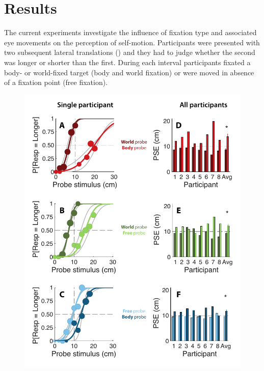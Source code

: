 \section{Results}

The current experiments investigate the influence of fixation type and associated eye movements on the perception of self-motion. Participants were presented with two subsequent lateral translations () and they had to judge whether the second was longer or shorter than the first. During each interval participants fixated a body- or world-fixed target (body and world fixation) or were moved in absence of a fixation point (free fixation).

\begin{figure}
    \includegraphics[width=1.0\textwidth]{src/paper3/figure2.pdf}


\end{figure}
